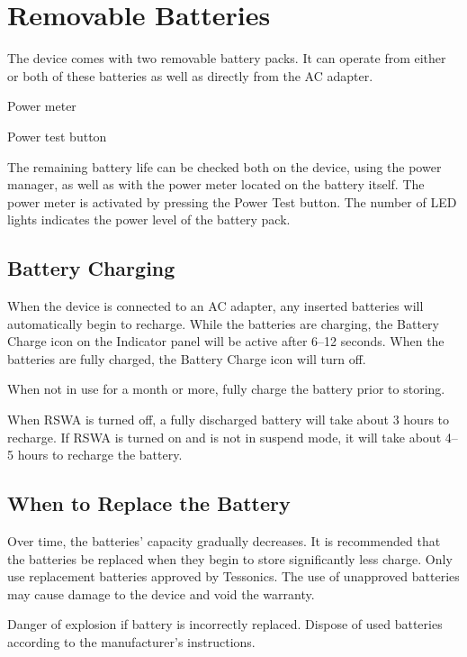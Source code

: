 \chapter[removable-batteries]{Removable Batteries}

The device comes with two removable battery packs. It can operate from either or
both of these batteries as well as directly from the AC adapter.


\startnarrow[middle=12em]
\startitemize[n,packed][stopper=.]
\item
Power meter
\item
Power test button
\stopitemize
\stopnarrow

The remaining battery life can be checked both on the device, using the power
manager, as well as with the power meter located on the battery itself. The
power meter is activated by pressing the Power Test button. The number of LED
lights indicates the power level of the battery pack.

\section[battery-charging]{Battery Charging}

When the device is connected to an AC adapter, any inserted batteries will
automatically begin to recharge. While the batteries are charging, the Battery
Charge icon on the Indicator panel will be active after 6–12 seconds. When the
batteries are fully charged, the Battery Charge icon will turn off.

When not in use for a month or more, fully charge the battery prior to
storing.
\stopNOTE

When RSWA is turned off, a fully discharged battery will take about 3 hours to
recharge. If RSWA is turned on and is not in suspend mode, it will take about
4–5 hours to recharge the battery.

\section[when-to-replace-the-battery]{When to Replace the Battery}

Over time, the batteries’ capacity gradually decreases. It is recommended that
the batteries be replaced when they begin to store significantly less charge.
Only use replacement batteries approved by Tessonics. The use of unapproved
batteries may cause damage to the device and void the warranty.

Danger of explosion if battery is incorrectly replaced. Dispose of
used batteries according to the manufacturer’s instructions.
\stopWARNING